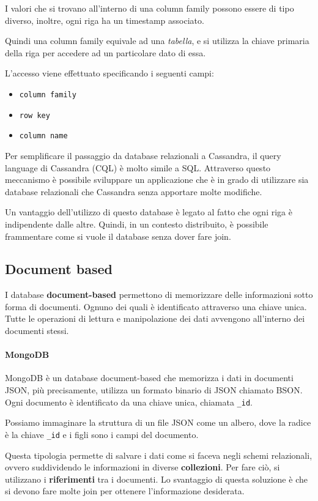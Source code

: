 I valori che si trovano all'interno di una column family possono essere di tipo
diverso, inoltre, ogni riga ha un timestamp associato.

Quindi una column family equivale ad una \textit{tabella}, e si utilizza la chiave
primaria della riga per accedere ad un particolare dato di essa.

L'accesso viene effettuato specificando i seguenti campi:
\begin{itemize}
      \item \texttt{column family}
      \item \texttt{row key}
      \item \texttt{column name}
\end{itemize}
Per semplificare il passaggio da database relazionali a Cassandra, il query
language di Cassandra (CQL) è molto simile a SQL. Attraverso questo meccanismo
è possibile sviluppare un applicazione che è in grado di utilizzare sia database
relazionali che Cassandra senza apportare molte modifiche.

Un vantaggio dell'utilizzo di questo database è legato al fatto che ogni riga è
indipendente dalle altre. Quindi, in un contesto distribuito, è possibile frammentare
come si vuole il database senza dover fare join.
\subsection{Document based}
I database \textbf{document-based} permettono di memorizzare delle informazioni sotto
forma di documenti. Ognuno dei quali è identificato attraverso una chiave unica.
Tutte le operazioni di lettura e manipolazione dei dati avvengono all'interno
dei documenti stessi.
\paragraph{MongoDB}
MongoDB è un database document-based che memorizza i dati in documenti JSON, più
precisamente, utilizza un formato binario di JSON chiamato BSON. Ogni documento
è identificato da una chiave unica, chiamata \texttt{\_id}.

Possiamo immaginare la struttura di un file JSON come un albero, dove la radice
è la chiave \texttt{\_id} e i figli sono i campi del documento.

Questa tipologia permette di salvare i dati come si faceva negli schemi relazionali,
ovvero suddividendo le informazioni in diverse \textbf{collezioni}. Per fare ciò,
si utilizzano i \textbf{riferimenti} tra i documenti. Lo svantaggio di questa
soluzione è che si devono fare molte join per ottenere l'informazione desiderata.

